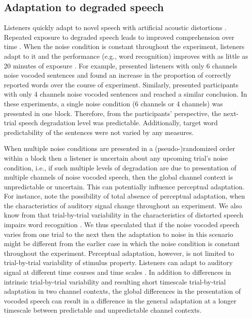 \documentclass[a4paper, nobind]{templates/ociamthesis}
\begin{document}
\hypertarget{adaptation-to-degraded-speech}{%
\subsection{Adaptation to degraded speech}\label{adaptation-to-degraded-speech}}

Listeners quickly adapt to novel speech with artificial acoustic distortions \autocite[e.g.,][]{Dupoux1997}.
Repeated exposure to degraded speech leads to improved comprehension over time \autocites[for a review,][]{Samuel2009,Guediche2014}.
When the noise condition is constant throughout the experiment, listeners adapt to it and the performance (e.g., word recognition) improves with as little as 20 minutes of exposure \autocite[e.g.,][]{Rosen1999}.
For example, \textcite[Experiment 1]{Davis2005} presented listeners with only 6 channels noise vocoded sentences and found an increase in the proportion of correctly reported words over the course of experiment.
Similarly, \textcite{Erb2013} presented participants with only 4 channels noise vocoded sentences and reached a similar conclusion.
In these experiments, a single noise condition (6 channels or 4 channels) was presented in one block.
Therefore, from the participants' perspective, the next-trial speech degradation level was predictable.
Additionally, target word predictability of the sentences were not varied by any measures.

When multiple noise conditions are presented in a (pseudo-)randomized order within a block then a listener is uncertain about any upcoming trial's noise condition, i.e., if such multiple levels of degradation are due to presentation of multiple channels of noise vocoded speech, then the global channel context is unpredictable or uncertain.
This can potentially influence perceptual adaptation.
For instance, \textcite{Mattys2012} note the possibility of total absence of perceptual adaptation, when the characteristics of auditory signal change throughout an experiment.
We also know from \textcite{Sommers1994} that trial-by-trial variability in the characteristics of distorted speech impairs word recognition \autocite[see also,][]{Dahan2006}.
We thus speculated that if the noise vocoded speech varies from one trial to the next then the adaptation to noise in this scenario might be different from the earlier case in which the noise condition is constant throughout the experiment.
Perceptual adaptation, however, is not limited to trial-by-trial variability of stimulus property.
Listeners can adapt to auditory signal at different time courses and time scales \autocites{Atienza2002}[see also,][]{Whitmire2016}.
In addition to differences in intrinsic trial-by-trial variability and resulting short timescale trial-by-trial adaptation in two channel contexts, the global differences in the presentation of vocoded speech can result in a difference in the general adaptation at a longer timescale between predictable and unpredictable channel contexts.
\end{document}
